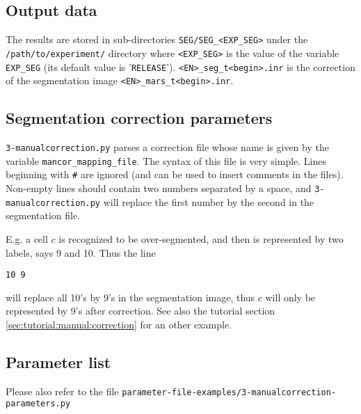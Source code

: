 \subsection{Output data}

The results are stored in sub-directories
\texttt{SEG/SEG\_<EXP\_SEG>} under the
\texttt{/path/to/experiment/} directory where \texttt{<EXP\_SEG>} is the value of the variable \texttt{EXP\_SEG} (its
default value is '\texttt{RELEASE}').
\texttt{<EN>\_seg\_t<begin>.inr} is the correction of the segmentation image \texttt{<EN>\_mars\_t<begin>.inr}.


\subsection{Segmentation correction parameters}

\texttt{3-manualcorrection.py} parses a correction file whose name is given by the variable \texttt{mancor\_mapping\_file}. The syntax of this file is very simple. Lines beginning with \texttt{\#} are ignored (and can be used to insert comments in the files). Non-empty lines should contain two numbers separated by a space, and \texttt{3-manualcorrection.py} will replace the first number by the second in the segmentation file.

E.g. a cell $c$ is recognized to be over-segmented, and then is represented by two labels, says 9 and 10. Thus the line
\begin{framed}
\begin{verbatim}
10 9
\end{verbatim}
\end{framed}
will replace all 10's by 9's in the segmentation image,  thus $c$ will only be represented by 9's after correction. See also the tutorial section \ref{sec:tutorial:manual:correction} for an other example.

\subsection{Parameter list}

Please also refer to the file
\texttt{parameter-file-examples/3-manualcorrection-parameters.py}


